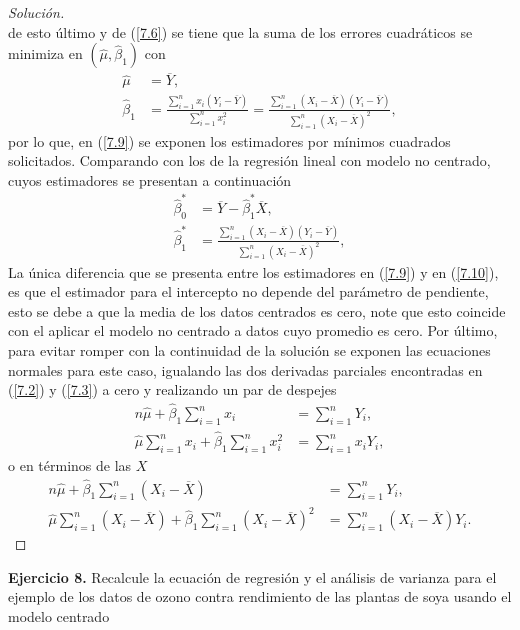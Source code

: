 \documentclass[10.5pt,notitlepage]{article}
\newenvironment{solucion}
  {\begin{proof}[Solución]}
  {\end{proof}}
\begin{document}
\begin{solucion}
\[\]
de esto último y de (\ref{7.6}) se tiene que la suma de los errores cuadráticos se minimiza en \((\hat{\mu}, \hat{\beta}_1)\) con 
\begin{align}\label{7.9}
    \hat{\mu} &= \overline{Y}, \nonumber\\
    \hat{\beta}_1 &= \frac{\sum_{i=1}^{n}x_i (Y_i-\overline{Y})}{\sum_{i=1}^{n}x_i^2} =\frac{\sum_{i=1}^{n}(X_i - \overline{X})(Y_i- \overline{Y})}{\sum_{i=1}^{n}(X_i - \overline{X})^2}, 
\end{align}
por lo que, en (\ref{7.9}) se exponen los estimadores por mínimos cuadrados solicitados. Comparando con los de la regresión lineal con modelo no centrado, cuyos estimadores se presentan a continuación
\begin{align}
    \hat{\beta}_{0}^{*} &= \overline{Y} -  \hat{\beta}_{1}^{*} \overline{X}, \nonumber\\
    \hat{\beta}_{1}^{*} &= \frac{\sum_{i=1}^{n}(X_i - \overline{X})(Y_i - \overline{Y})}{\sum_{i=1}^{n}(X_i - \overline{X})^2}, \label{7.10} 
\end{align}
La única diferencia que se presenta entre los estimadores en (\ref{7.9}) y en (\ref{7.10}), es que el estimador para el intercepto no depende del parámetro de pendiente, esto se debe a que la media de los datos centrados es cero, note que esto coincide con el aplicar el modelo no centrado a datos cuyo promedio es cero. Por último, para evitar romper con la continuidad de la solución se exponen las ecuaciones normales para este caso, igualando las dos derivadas parciales encontradas en (\ref{7.2}) y (\ref{7.3}) a cero y realizando un par de despejes 
\begin{align*}
     n\hat{\mu} + \hat{\beta}_1\sum_{i=1}^{n}x_i &=  \sum_{i=1}^{n}Y_i, \\ 
     \hat{\mu}\sum_{i=1}^{n}x_i + \hat{\beta}_1 \sum_{i=1}^{n}x_{i}^2 &= \sum_{i=1}^{n}x_iY_i,
\end{align*}
o en términos de las \(X\)
\begin{align*}
     n\hat{\mu} + \hat{\beta}_1\sum_{i=1}^{n}(X_i-\overline{X}) &=  \sum_{i=1}^{n}Y_i, \\ 
     \hat{\mu}\sum_{i=1}^{n}(X_i-\overline{X}) + \hat{\beta}_1 \sum_{i=1}^{n}(X_i-\overline{X})^2 &= \sum_{i=1}^{n}(X_i-\overline{X})Y_i.
\end{align*}
\end{solucion}
\noindent \textbf{Ejercicio 8.} Recalcule la ecuación de regresión y el análisis de varianza para el ejemplo de los datos de ozono contra rendimiento de las plantas de soya usando el modelo centrado 
\end{document}
